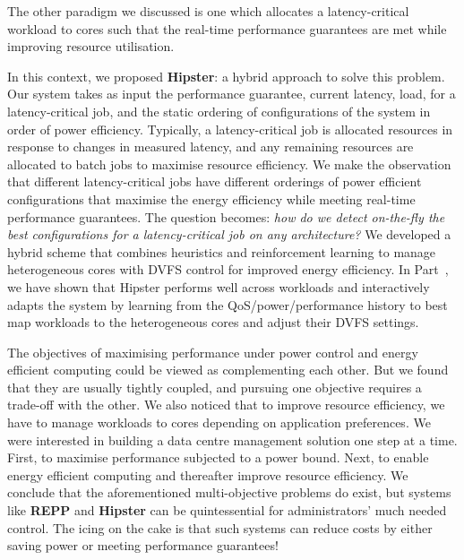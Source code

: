  The other paradigm we discussed is one which allocates a latency-critical
workload to cores such that the real-time performance guarantees are met while improving
resource utilisation.  

 In this context, we proposed \textbf{Hipster}: a hybrid approach to solve
this problem.  Our system takes as input the performance guarantee, current latency, load,
for a latency-critical job, and the static ordering of configurations of the system in
order of power efficiency.  Typically, a latency-critical job is allocated resources in
response to changes in measured latency, and any remaining resources are allocated to
batch jobs to maximise resource efficiency.  We make the observation that different
latency-critical jobs have different orderings of power efficient configurations that
maximise the energy efficiency while meeting real-time performance guarantees.  The
question becomes: \emph{how do we detect on-the-fly the best configurations for a
latency-critical job on any architecture?} We developed a hybrid scheme that combines
heuristics and reinforcement learning to manage heterogeneous cores with DVFS control for
improved energy efficiency.  In Part~, we have shown that Hipster performs well
across workloads and interactively adapts the system by learning from the
QoS/power/performance history to best map workloads to the heterogeneous cores and adjust
their DVFS settings. 

The objectives of maximising performance under power control and energy efficient
computing could be viewed as complementing each other. But we found that they are usually
tightly coupled, and pursuing one objective requires a trade-off with the other.  We also
noticed that to improve resource efficiency, we have to manage workloads to cores
depending on application preferences. We were interested in building a data centre
management solution one step at a time. First, to maximise performance subjected to a
power bound. Next, to enable energy efficient computing and thereafter improve resource
efficiency. We conclude that the aforementioned multi-objective problems do exist, but
systems like \textbf{REPP} and \textbf{Hipster} can be quintessential for administrators'
much needed control. The icing on the cake is that such systems can reduce costs by
either saving power or meeting performance guarantees!
